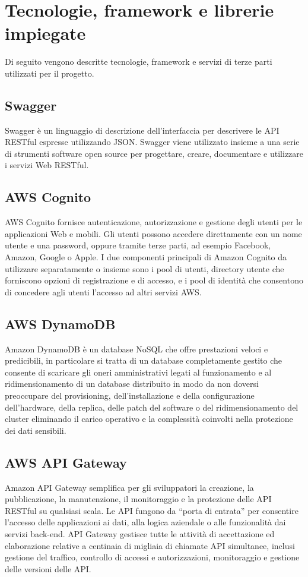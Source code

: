 \section{Tecnologie, framework e librerie impiegate}
Di seguito vengono descritte tecnologie, framework e servizi di terze parti utilizzati per il progetto.
\subsection{Swagger}
Swagger è un linguaggio di descrizione dell'interfaccia per descrivere le API RESTful espresse utilizzando JSON. Swagger viene utilizzato insieme a una serie di strumenti software open source per progettare, creare, documentare e utilizzare i servizi Web RESTful.
\subsection{AWS Cognito}
AWS Cognito fornisce autenticazione, autorizzazione e gestione degli utenti per le applicazioni Web e mobili. Gli utenti possono accedere direttamente con un nome utente e una password, oppure tramite terze parti, ad esempio Facebook, Amazon, Google o Apple.
I due componenti principali di Amazon Cognito da utilizzare separatamente o insieme sono i pool di utenti, directory utente che forniscono opzioni di registrazione e di accesso, e i pool di identità che consentono di concedere agli utenti l'accesso ad altri servizi AWS.
\subsection{AWS DynamoDB} 
Amazon DynamoDB è un database NoSQL che offre prestazioni veloci e predicibili, in particolare si tratta di un database completamente gestito che consente di scaricare gli oneri amministrativi legati al funzionamento e al ridimensionamento di un database distribuito in modo da non doversi preoccupare del provisioning, dell'installazione e della configurazione dell'hardware, della replica, delle patch del software o del ridimensionamento del cluster eliminando il carico operativo e la complessità coinvolti nella protezione dei dati sensibili. 

\subsection{AWS API Gateway}
Amazon API Gateway semplifica per gli sviluppatori la creazione, la pubblicazione, la manutenzione, il monitoraggio e la protezione delle API RESTful su qualsiasi scala. Le API fungono da “porta di entrata” per consentire l’accesso delle applicazioni ai dati, alla logica aziendale o alle funzionalità dai servizi back-end. 
API Gateway gestisce tutte le attività di accettazione ed elaborazione relative a centinaia di migliaia di chiamate API simultanee, inclusi gestione del traffico, controllo di accessi e autorizzazioni, monitoraggio e gestione delle versioni delle API. 

